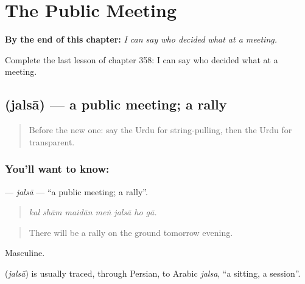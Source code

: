 
\chapter{The Public Meeting}
\label{ch:ur-the-public-meeting}

\begin{chapteropening}
\textbf{By the end of this chapter:} \emph{I can say who decided what at a meeting.}

Complete the last lesson of chapter 358: I can say who decided what at a meeting.
\end{chapteropening}

\section[\texorpdfstring{\ur{جلسہ} (jalsā)}{جلسہ (jalsā)}]{ (jalsā) — a public meeting; a rally}

\label{lesson:UR-C358-jalsa}



\begin{quote}
Before the new one: say the Urdu for string-pulling, then the Urdu for transparent.
\end{quote}

\subsection*{You'll want to know: }
\textbf{} — \emph{jalsā} — \textquotedblleft{}a public meeting; a rally\textquotedblright{}.

\begin{quote}
      
\end{quote}

\begin{quote}
\emph{kal shām maidān meṅ jalsā ho gā.}
\end{quote}

\begin{quote}
There will be a rally on the ground tomorrow evening.
\end{quote}

Masculine.

\begin{cousinweb}
\textbf{} (\emph{jalsā}) is usually traced, through Persian, to Arabic \emph{jalsa}, \textquotedblleft{}a sitting, a session\textquotedblright{}.
\end{cousinweb}

